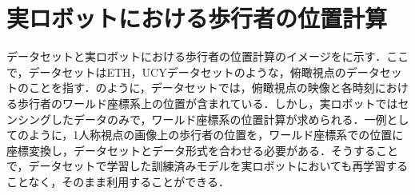 \section{実ロボットにおける歩行者の位置計算}\label{sec:real-robot}
データセットと実ロボットにおける歩行者の位置計算のイメージをに示す．ここで，データセットはETH\cite{pellegrini2009you-eth}，UCY\cite{lerner2007crowds-ucy}データセットのような，俯瞰視点のデータセットのことを指す．のように，データセットでは，俯瞰視点の映像と各時刻における歩行者のワールド座標系上の位置が含まれている．しかし，実ロボットではセンシングしたデータのみで，ワールド座標系の位置計算が求められる．一例としてのように，1人称視点の画像上の歩行者の位置を，ワールド座標系での位置に座標変換し，データセットとデータ形式を合わせる必要がある．そうすることで，データセットで学習した訓練済みモデルを実ロボットにおいても再学習することなく，そのまま利用することができる．

